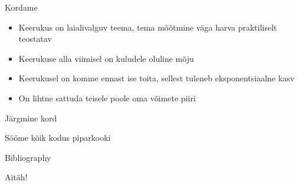 \documentclass{beamer}
\begin{document}
\begin{frame}{Kordame}
	\begin{itemize}
		\item Keerukus on laialivalguv teema, tema mõõtmine väga harva praktiliselt teostatav 
		\item Keerukuse alla viimisel on kuludele oluline mõju
		\item Keerukusel on komme ennast ise toita, sellest tuleneb eksponentsiaalne kasv
		\item On lihtne sattuda teisele poole oma võimete piiri
	\end{itemize}
\end{frame}

\begin{frame}{Järgmine kord}
\begin{center}
Sööme kõik kodus piparkooki
\end{center}
\end{frame}

\begin{frame}{Bibliography}
	
	
\end{frame}

\begin{frame}[standout]
Aitäh!
\end{frame}
\end{document}

